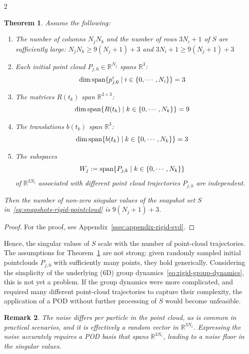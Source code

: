 \documentclass{article}
\newtheorem{theorem}{Theorem}[section]
\newtheorem{proof}{Proof}[theorem]
\newtheorem{remark}[theorem]{Remark}
\newcommand{\R}{\mathbb{R}}                                 %
\begin{document}
\begin{multicols}{2}
\begin{theorem}\label{thm:singular-values-rigid-snapshots}
    Assume the following:
    \begin{enumerate}
        \item The number of columns $N_jN_k$ and the number of rows $3N_i+1$ of $S$ are sufficiently large: $N_jN_k \geq 9(N_j+1)+3$ and $3N_i+1 \geq 9(N_j+1)+3$
        \item Each initial point cloud $P_{j,0} \in \R^{N_j}$ spans $\R^3$: $$\dim\textnormal{span}\{p^i_{j,0}\;|\;i \in \{0,\cdots,N_i\}\} = 3$$
        \item The matrices $R(t_k)$ span $\R^{3\times 3}$: $$\dim\textnormal{span}\{R(t_k)\;|\;k \in \{0,\cdots,N_k\}\} = 9$$
        \item The translations $b(t_k)$ span $\R^3$: $$\dim\textnormal{span}\{b(t_k)\;|\;k \in \{0,\cdots,N_k\}\} = 3$$
        \item The subspaces $$W_j := \textnormal{span}\{P_{j,k}\;|\; k \in \{0,\cdots,N_k\} \}$$ of $\R^{3N_i}$ associated with different point cloud trajectories $P_{j,k}$ are independent. 
    \end{enumerate}  
    Then the number of non-zero singular values of the snapshot set $S$ in~\eqref{eq:snapshots-rigid-pointcloud} is $9(N_j+1)+3$.
\end{theorem}

\begin{proof}
    For the proof, see Appendix~\ref{ssec:appendix-rigid-svd}.
\end{proof}

Hence, the singular values of $S$ scale with the number of point-cloud trajectories. The assumptions for Theorem~\ref{thm:singular-values-rigid-snapshots} are not strong: given randomly sampled initial pointclouds $P_{j,0}$ with sufficiently many points, they hold generically. Considering the simplicity of the underlying (6D) group dynamics~\eqref{eq:rigid-group-dynamics}, this is not yet a problem. If the group dynamics were more complicated, and required many different point-cloud trajectories to capture their complexity, the application of a POD without further processing of $S$ would become unfeasible. 

\begin{remark}\label{rem:noisefloor-rigid-snapshots}
    The noise differs per particle in the point cloud, as is common in practical scenarios, and it is effectively a random vector in $\mathbb{R}^{3N_i}$. Expressing the noise accurately requires a POD basis that spans $\mathbb{R}^{3N_i}$, leading to a noise floor in the singular values.
\end{remark}


\end{multicols}
\end{document}
